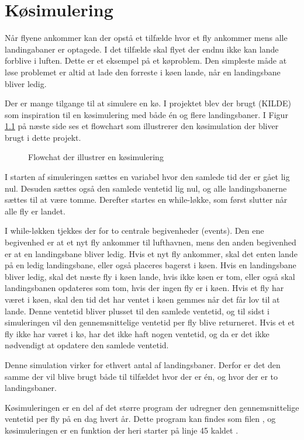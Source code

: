 \chapter{Køsimulering} \label{chap:queue}
Når flyene ankommer kan der opstå et tilfælde hvor et fly ankommer mens alle landingabaner er optagede.
I det tilfælde skal flyet der endnu ikke kan lande forblive i luften.
Dette er et eksempel på et køproblem. Den simpleste måde at løse problemet er altid at lade den forreste i køen lande, når en landingsbane bliver ledig.

Der er mange tilgange til at simulere en kø. I projektet blev der brugt (KILDE) som inspiration til en køsimulering med både én og flere landingsbaner.
I Figur \ref{fig:queue_flowchart} på næste side ses et flowchart som illustrerer den køsimulation der bliver brugt i dette projekt.

\begin{figure}
	\centering
	\scalebox{0.7}{
		
	}
	\caption{Flowchat der illustrer en køsimulering} \label{fig:queue_flowchart}
\end{figure}

I starten af simuleringen sættes en variabel hvor den samlede tid der er gået lig nul.
Desuden sættes også den samlede ventetid lig nul, og alle landingsbanerne sættes til at være tomme. Derefter startes en while-løkke, som først slutter når alle fly er landet.

I while-løkken tjekkes der for to centrale begivenheder (events).
Den ene begivenhed er at et nyt fly ankommer til lufthavnen, mens den anden begivenhed er at en landingsbane bliver ledig.
Hvis et nyt fly ankommer, skal det enten lande på en ledig landingsbane, eller også placeres bagerst i køen.
Hvis en landingsbane bliver ledig, skal det næste fly i køen lande, hvis ikke køen er tom, eller også skal landingsbanen opdateres som tom, hvis der ingen fly er i køen.
Hvis et fly har været i køen, skal den tid det har ventet i køen gemmes når det får lov til at lande. Denne ventetid bliver plusset til den samlede ventetid, og til sidst i simuleringen vil den gennemsnittelige ventetid per fly blive returneret. 
Hvis et et fly ikke har været i kø, har det ikke haft nogen ventetid, og da er det ikke nødvendigt at opdatere den samlede ventetid.

Denne simulation virker for ethvert antal af landingsbaner.
Derfor er det den samme der vil blive brugt både til tilfældet hvor der er én, og hvor der er to landingsbaner.

Køsimuleringen er en del af det større program der udregner den gennemsnittelige ventetid per fly på en dag hvert år.
Dette program kan findes som filen , og køsimuleringen er en funktion der heri starter på linje 45 kaldet .
